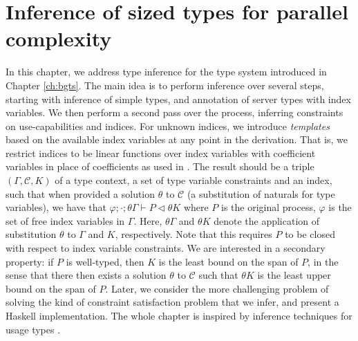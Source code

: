 \chapter{Inference of sized types for parallel complexity}\label{ch:timeinference}

In this chapter, we address type inference for the type system introduced in Chapter \ref{ch:bgts}. The main idea is to perform inference over several steps, starting with inference of simple types, and annotation of server types with index variables. We then perform a second pass over the process, inferring constraints on use-capabilities and indices. For unknown indices, we introduce \textit{templates} based on the available index variables at any point in the derivation. That is, we restrict indices to be linear functions over index variables with coefficient variables in place of coefficients as used in \cite{HofmannAndJost2003,HofmannAndHoffmann2010,HoffmannEtAl2012}. The result should be a triple $(\Gamma,\mathcal{C},K)$ of a type context, a set of type variable constraints and an index, such that when provided a solution $\theta$ to $\mathcal{C}$ (a substitution of naturals for type variables), we have that $\varphi;\cdot;\theta\Gamma\vdash P \triangleleft \theta K$ where $P$ is the original process, $\varphi$ is the set of free index variables in $\Gamma$. Here, $\theta\Gamma$ and $\theta K$ denote the application of substitution $\theta$ to $\Gamma$ and $K$, respectively. Note that this requires $P$ to be closed with respect to index variable constraints. We are interested in a secondary property: if $P$ is well-typed, then $K$ is the least bound on the span of $P$, in the sense that there then exists a solution $\theta$ to $\mathcal{C}$ such that $\theta K$ is the least upper bound on the span of $P$. Later, we consider the more challenging problem of solving the kind of constraint satisfaction problem that we infer, and present a Haskell implementation. The whole chapter is inspired by inference techniques for usage types \cite{KobayashiEtAl2000,Kobayashi2005}.
%
